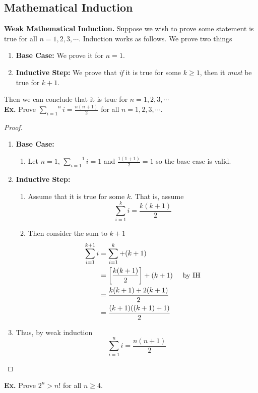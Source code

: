 \documentclass[class=article, crop=false]{standalone}
\def\inlinesum#1#2{\overset{#2}{\underset{#1}{\sum}}}
\begin{document}
\subsection{Mathematical Induction}
\textbf{Weak Mathematical Induction.} Suppose we wish to prove some statement is true for all $n=1,2,3,\cdots$.
Induction works as follows. We prove two things
\begin{enumerate}[1.]
	\item \textbf{Base Case:} We prove it for $n=1$.
	\item \textbf{Inductive Step:} We prove that \emph{if} it is true for some $k\geq 1$, then it \emph{must} be true for $k+1$.
\end{enumerate}
Then we can conclude that it is true for $n=1,2,3,\cdots$\\
\textbf{Ex.} Prove $\inlinesum{i=1}{n}i = \frac{n(n+1)}{2}$ for all $n=1,2,3,\cdots$.
\begin{proof}
	$ $\\
	\begin{enumerate}
		\item[] \textbf{Base Case:} 
			\begin{enumerate}
				\item[] Let $n=1$, $\inlinesum{i=1}{1} i = 1$ and $\frac{1(1+1)}{2}=1$ so the base case is valid.
			\end{enumerate}
		\item[] \textbf{Inductive Step:}
			\begin{enumerate}
				\item[] Assume that it is true for some $k$. That is, assume $$\sum_{i=1}^{k} i = \frac{k(k+1)}{2}$$
				\item[] Then consider the sum to $k+1$
					\begin{align*}
						\sum_{i=1}^{k+1} i &= \sum_{i=1}^{k} + (k+1) \\
						&= \left[\frac{k(k+1)}{2}\right] + (k+1) \hspace{5mm}\text{by IH} \\
						&= \frac{k(k+1) + 2(k+1)}{2} \\
						&= \frac{(k+1)((k+1)+1)}{2}
					\end{align*}
			\end{enumerate}
		\item[] Thus, by weak induction $$\inlinesum{i=1}{n}i = \frac{n(n+1)}{2}$$
	\end{enumerate}
\end{proof}
\noindent\textbf{Ex.} Prove $2^n > n!$ for all $n\geq 4$.
\end{document}
